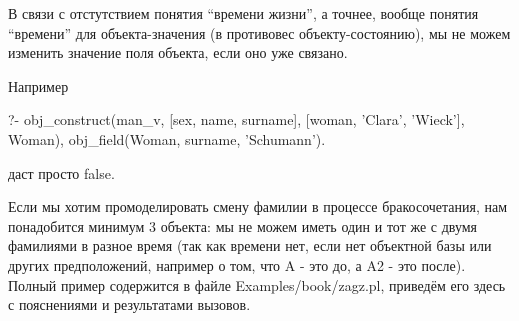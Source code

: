 \documentclass[a4paper]{book}
\begin{document}
В связи с отстутствием понятия ``времени жизни'', а точнее,
вообще понятия ``времени'' для объекта-значения (в противовес
объекту-состоянию), мы не можем изменить значение поля объекта,
если оно уже связано.

Например

\begin{example}{}{}
?- obj_construct(man_v, [sex, name, surname], 
                        [woman, 'Clara', 'Wieck'], Woman), 
   obj_field(Woman, surname, 'Schumann').
\end{example}

даст просто false.


Если мы хотим промоделировать смену фамилии в процессе
бракосочетания, нам понадобится минимум 3 объекта: мы не можем
иметь один и тот же с двумя фамилиями в разное время (так как
времени нет, если нет объектной базы или других предположений,
например о том, что A - это до, а A2 - это после). Полный пример
содержится в файле Examples/book/zagz.pl, приведём его здесь с
пояснениями и результатами вызовов.
\end{document}
